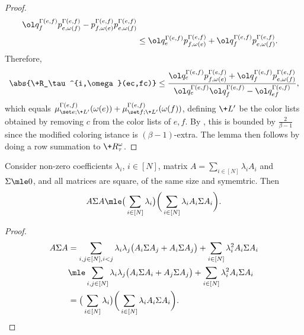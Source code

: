 \begin{proof}
\begin{align*}
{         \ol q^{\Gamma(e,f)}_f p^{\Gamma(e, f)}_{e, \omega(f)} -
         p^{\Gamma(e, f)}_{f, \omega(e)} p^{\Gamma(e, f)}_{e, \omega(f)} }
    \\&\le 
         \ol q^{\Gamma(e,f)}_e p^{\Gamma(e, f)}_{f, \omega(e)} +
         \ol q^{\Gamma(e,f)}_f p^{\Gamma(e, f)}_{e, \omega(f)}.
    \end{align*}
    Therefore,
	\begin{align*}
		\abs{\+R_\tau^{i,\omega}(ec,fc)} \le
        \frac{
         \ol q^{\Gamma(e,f)}_e p^{\Gamma(e, f)}_{f, \omega(e)} +
         \ol q^{\Gamma(e,f)}_f p^{\Gamma(e, f)}_{e, \omega(f)}
        }{
        \ol q^{\Gamma(e,f)}_e \ol q^{\Gamma(e,f)}_f - \ol q^{\Gamma(e,f)}_{ef}
        },
	\end{align*}
    which equals 
    $\mu^{\Gamma(e, f)}_{\set e;\+L'}(\omega(e)) + \mu^{\Gamma(e, f)}_{\set f;\+L'}(\omega(f))$,
    defining $\+L'$ be the color lists obtained by removing $c$ from the color lists of $e, f$.
    By , this is bounded by $\frac{2}{\beta-1}$
    since the modified coloring istance is $(\beta-1)$-extra.
    The lemma then follows by doing a row summation to $\+R_\tau^\omega$.
\end{proof}

\begin{proposition}\label{prop:matrix-sq-coeff}
    Consider non-zero coefficients $\lambda_i$, $i\in [N]$, matrix $A = \sum_{i\in [N]}\lambda_i A_i$ and 
    $\Sigma\mle 0$, and all matrices are square, of the same size and symemtric. Then
    \[
    A\Sigma A \mle
    \big(\sum_{i\in [N]} \lambda_i\big)
    \bigg( \sum_{i\in [N]}\lambda_i A_i\Sigma A_i \bigg).
    \]
\end{proposition}
\begin{proof}
    \begin{align*}
    A\Sigma A &= \sum_{i, j\in [N], i < j} \lambda_i\lambda_j \big( A_i\Sigma A_j + A_i\Sigma A_j \big)
               + \sum_{i\in [N]}\lambda_i^2 A_i\Sigma A_i
    \\& \mle \sum_{i, j\in [N]} \lambda_i\lambda_j\big( A_i\Sigma A_i + A_j\Sigma A_j \big)
               + \sum_{i\in [N]}\lambda_i^2 A_i\Sigma A_i
    \\& = 
    \big(\sum_{i\in [N]} \lambda_i\big)
    \bigg( \sum_{i\in [N]}\lambda_i A_i\Sigma A_i \bigg).
    \end{align*}
\end{proof}

